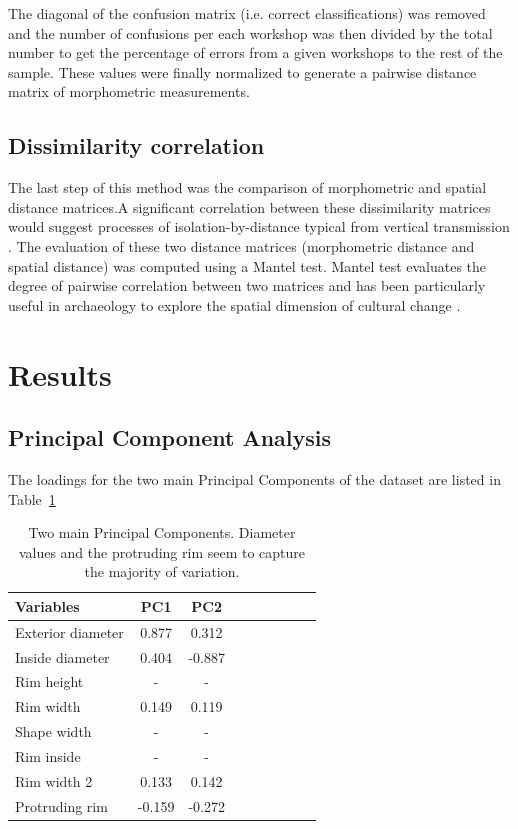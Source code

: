 \documentclass[review]{elsarticle}
\begin{document}
The diagonal of the confusion matrix (i.e. correct classifications) was removed and the number of confusions per each workshop was then divided by the total number to get the percentage of errors from a given workshops to the rest of the sample. These values were finally normalized to generate a pairwise distance matrix of morphometric measurements.

\subsection{Dissimilarity correlation}
The last step of this method was the comparison of morphometric and spatial distance matrices.A significant correlation between these dissimilarity matrices would suggest processes of isolation-by-distance typical from vertical transmission \citep{crema_culture_2014}. The evaluation of these two distance matrices (morphometric distance and spatial distance) was computed using a Mantel test. Mantel test evaluates the degree of pairwise correlation between two matrices and has been particularly useful in archaeology to explore the spatial dimension of cultural change \citep{mantel_detection_1967, diniz-filho_mantel_2013, crema_culture_2014}.  

\section{Results}

\subsection{Principal Component Analysis}

The loadings for the two main Principal Components of the dataset are listed in Table~\ref{table:pca}

\begin{table}[htp]
\centering
\begin{tabular}{lcccccccc}
\hline
Variables & PC1 & PC2 \\ \hline
Exterior diameter & 0.877 & 0.312 \\
Inside diameter & 0.404 & -0.887 \\
Rim height & - & - \\
Rim width & 0.149 & 0.119 \\
Shape width & - & - \\
Rim inside & - & - \\
Rim width 2 & 0.133 & 0.142 \\
Protruding rim & -0.159 & -0.272 \\
\hline
\end{tabular}
\caption{Two main Principal Components. Diameter values and the protruding rim seem to capture the majority of variation.}
\label{table:pca}
\end{table}
\end{document}
